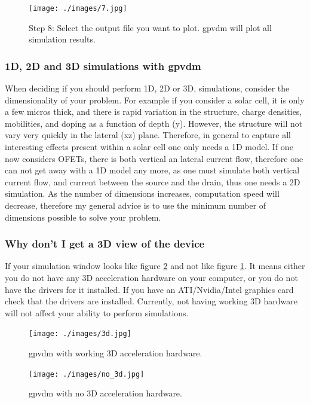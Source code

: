 \documentclass[11pt]{article}
\begin{document}
\begin{figure}[ht!]
\centering
\texttt{[image: ./images/7.jpg]}
\caption*{Step 8: Select the output file you want to plot.  gpvdm will plot all simulation results.}
\end{figure}

\subsubsection{1D, 2D and 3D simulations with gpvdm}
When deciding if you should perform 1D, 2D or 3D, simulations, consider the dimensionality of your problem.  For example if you consider a solar cell, it is only a few micros thick, and there is rapid variation in the structure, charge densities, mobilities, and doping as a function of depth (y).  However, the structure will not vary very quickly in the lateral (xz) plane.  Therefore, in general  to capture all interesting effects present within a solar cell one only needs a 1D model.  If one now considers OFETs, there is both vertical an lateral current flow, therefore one can not get away with a 1D model any more, as one must simulate both vertical current flow, and current between the source and the drain, thus one needs a 2D simulation.  As the number of dimensions increases, computation speed will decrease, therefore my general advice is to use the minimum number of dimensions possible to solve your problem.

\subsubsection{Why don't I get a 3D view of the device}
If your simulation window looks like figure \ref{fig:nothreed} and not like figure \ref{fig:threed}.  It means  either you do not have any 3D acceleration hardware on your computer, or you do not have the drivers for it installed.  If you have an ATI/Nvidia/Intel graphics card check that the drivers are installed.  Currently, not having working 3D hardware will not affect your ability to perform simulations.

\begin{figure}[ht!]
\centering
\texttt{[image: ./images/3d.jpg]}
\caption{gpvdm with working 3D acceleration hardware.}
\label{fig:threed}
\end{figure}

\begin{figure}[ht!]
\centering
\texttt{[image: ./images/no\_3d.jpg]}
\caption{gpvdm with no 3D acceleration hardware.}
\label{fig:nothreed}
\end{figure}
\end{document}
